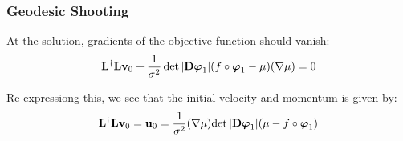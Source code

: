 

\begin{frame}
\frametitle{Geodesic Shooting}
At the solution, gradients of the objective function should vanish:
\begin{align*}
{\bf L}^{\dagger}{\bf L} {\bf v}_{0} + \frac{1}{\sigma^2} \det | {\bf D}{\boldsymbol\varphi}_{1} | (f \circ {\boldsymbol\varphi}_1 - \mu)(\nabla \mu) = 0
\end{align*}

Re-expressiong this, we see that the initial velocity and momentum is given by:
\begin{align*}
{\bf L}^{\dagger}{\bf L} {\bf v}_{0} = {\bf u}_0 = {\frac{1}{\sigma^2} (\nabla \mu)} {\det | {\bf D}{\boldsymbol\varphi}_{1} | (\mu - f \circ {\boldsymbol\varphi}_1)}
\end{align*}
\end{frame}

